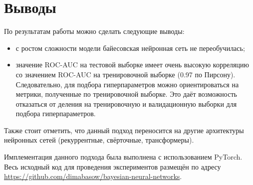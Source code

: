 \documentclass{article}
\numberwithin{equation}{section}
\begin{document}
    \section{Выводы}
    По результатам работы можно сделать следующие выводы:
    \begin{itemize}
        \item с ростом сложности модели байесовская нейронная сеть не переобучилась;
        \item значение ROC-AUC на тестовой выборке
        имеет очень высокую корреляцию со значением ROC-AUC на тренировочной выборке (0.97 по Пирсону).
        Следовательно, для подбора гиперпараметров можно ориентироваться на метрики,
        полученные по тренировочной выборке.
        Это даёт возможность отказаться от деления на тренировочную и валидационную выборки
        для подбора гиперпараметров.
    \end{itemize}

    Также стоит отметить,
    что данный подход переносится на другие архитектуры нейронных сетей
    (рекуррентные, свёрточные, трансформеры).

    Имплементация данного подхода была выполнена с использованием PyTorch.
    Весь исходный код для проведения экспериментов размещён по адресу
    \url{https://github.com/dimabasow/bayesian-neural-networks}.
\end{document}

